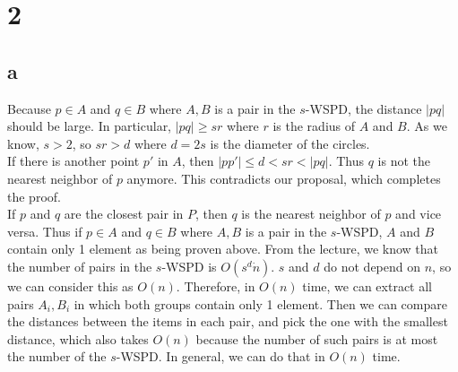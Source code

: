 \section*{2}
\subsection*{a}

Because $p \in A$ and $q \in B$ where ${A,B}$ is a pair in the $s$-WSPD, the distance $|pq|$ should be large. In particular, $|pq| \geq sr$ where $r$ is the radius of $A$ and $B$. As we know, $s > 2$, so $sr > d$ where $d = 2s$ is the diameter of the circles. \\

If there is another point $p'$ in $A$, then $|pp'| \leq d < sr < |pq|$. Thus $q$ is not the nearest neighbor of $p$ anymore. This contradicts our proposal, which completes the proof.\\

If $p$ and $q$ are the closest pair in $P$, then $q$ is the nearest neighbor of $p$ and vice versa. Thus if $p \in A$ and $q \in B$ where ${A,B}$ is a pair in the $s$-WSPD, $A$ and $B$ contain only 1 element as being proven above. From the lecture, we know that the number of pairs in the $s$-WSPD is $O(s^d \dot n)$. $s$ and $d$ do not depend on $n$, so we can consider this as $O(n)$. Therefore, in $O(n)$ time, we can extract all pairs ${A_i, B_i}$ in which both groups contain only 1 element. Then we can compare the distances between the items in each pair, and pick the one with the smallest distance, which also takes $O(n)$ because the number of such pairs is at most the number of the $s$-WSPD. In general, we can do that in $O(n)$ time.\\


